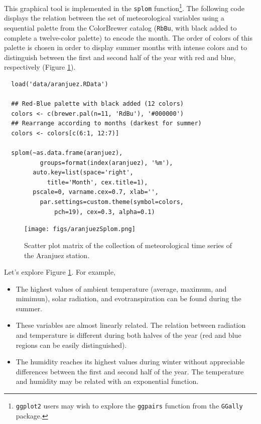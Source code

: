 \documentclass[smallroyalvopaper]{memoir}
\begin{document}
This graphical tool is implemented in the \texttt{splom} function\footnote{\texttt{ggplot2} users may wish to explore the \texttt{ggpairs} function
from the \texttt{GGally} package.}. The
following code displays the relation between the set of
meteorological variables using a sequential palette from the
ColorBrewer catalog (\texttt{RbBu}, with black added to complete a
twelve-color palette) to encode the month. The order of colors of
this palette is chosen in order to display summer months with
intense colors and to distinguish between the first and second
half of the year with red and blue, respectively (Figure
\ref{fig:orgparagraph1}).


\lstset{language=R,label= ,caption= ,captionpos=b,numbers=none}
\begin{lstlisting}
  load('data/aranjuez.RData')
  
  ## Red-Blue palette with black added (12 colors)
  colors <- c(brewer.pal(n=11, 'RdBu'), '#000000')
  ## Rearrange according to months (darkest for summer)
  colors <- colors[c(6:1, 12:7)]
  
  splom(~as.data.frame(aranjuez),
          groups=format(index(aranjuez), '%m'),
        auto.key=list(space='right', 
            title='Month', cex.title=1),
        pscale=0, varname.cex=0.7, xlab='',
          par.settings=custom.theme(symbol=colors,
              pch=19), cex=0.3, alpha=0.1)
\end{lstlisting}

\begin{figure}[htb]
\centering
\texttt{[image: figs/aranjuezSplom.png]}
\caption{\label{fig:orgparagraph1}
Scatter plot matrix of the collection of meteorological time series of the Aranjuez station.}
\end{figure}


Let's explore Figure \ref{fig:orgparagraph1}. For example,
\begin{itemize}
\item The highest values of ambient temperature (average, maximum, and
mimimun), solar radiation, and evotranspiration can be found
during the summer.
\item These variables are almost linearly related. The relation
between radiation and temperature is different during both
halves of the year (red and blue regions can be easily distinguished).
\item The humidity reaches its highest values during winter without
appreciable differences between the first and second half of the
year. The temperature and humidity may be related with an
exponential function.
\end{itemize}
\end{document}
